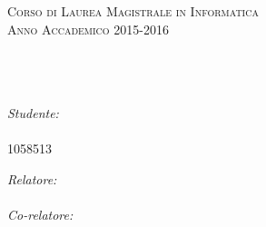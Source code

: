 \documentclass[
12pt, %
english, %
onehalfspacing, %
headsepline, %
]{MastersDoctoralThesis} %
\author{Carlo Maria \textsc{Massimo}} %
\begin{document}
\frontmatter %

\pagestyle{plain} %


\begin{titlepage}
\begin{center}

\textsc{\LARGE \univname}\\[1.5cm] %
\textsc{\large \deptname}\\[0.5cm] %

 
\textsc{ Corso di Laurea Magistrale in Informatica}\\[0.5cm] %
\textsc{\small Anno Accademico 2015-2016}\\[2.5cm] %

\HRule \\[0.4cm] %
{\huge \bfseries \ttitle}\\[0.4cm] %
\HRule \\[1.5cm] %

\begin{minipage}[t]{0.4\textwidth}
\begin{flushleft} \large
\emph{Studente:}\\
\authorname\\1058513 %
\end{flushleft}
\end{minipage}
\begin{minipage}[t]{0.5\textwidth}
\begin{flushright} \large
\emph{Relatore:} \\
\supname\\ %
\emph{Co-relatore:} \\
\cosupname %
\end{flushright}
\end{minipage}\\[3cm]

 
\vfill
\end{center}
\end{titlepage}
\end{document}
